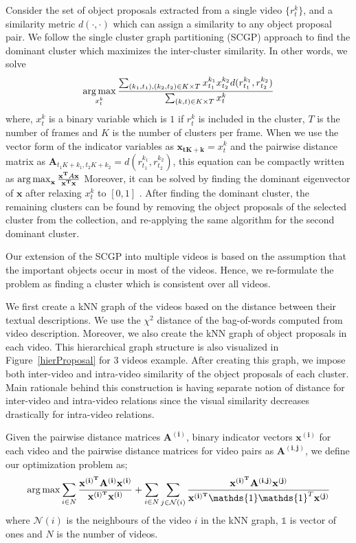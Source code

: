 Consider the set of object proposals extracted from a single video $\{r^k_t\}$, and a similarity metric $d(\cdot,\cdot)$ which can assign a similarity to any object proposal pair. We follow the single cluster graph partitioning (SCGP)\cite{scgp} approach to find the dominant cluster which maximizes the inter-cluster similarity. In other words, we solve
\begin{equation}
  \operatorname*{arg\,max}_{x^k_t} \frac{\sum_{(k_1,t_1),(k_2,t_2) \in K \times T} x^{k_1}_{t_1} x^{k_2}_{t_2} d(r^{k_1}_{t_1},r^{k_2}_{t_2})}{\sum_{(k,t) \in K \times T} x^{k}_t}
\end{equation}
where, $x^{k}_t$ is a binary variable which is $1$ if $r^{k}_t$ is included in the cluster, $T$ is the number of frames and $K$ is the number of clusters per frame. When we use the vector form of the indicator variables as $\mathbf{x_{tK+k}}=x^{k}_{t}$ and the pairwise distance matrix as $\mathbf{A}_{t_1K+k_1,t_2K+k_2}=d(r^{k_1}_{t_1},r^{k_2}_{t_2})$, this equation can be compactly written as
$\operatorname*{arg\,max}_{\mathbf{x}} \frac{\mathbf{x^T}A\mathbf{x}}{\mathbf{x^T}\mathbf{x}}$
Moreover, it can be solved by finding the dominant eigenvector of $\mathbf{x}$ after relaxing $x^{k}_t$ to $[0,1]$ \cite{scgp,scgp_eigen}. After finding the dominant cluster, the remaining clusters can be found by removing the object proposals of the selected cluster from the collection, and re-applying the same algorithm for the second dominant cluster.

Our extension of the SCGP into multiple videos is based on the assumption that the important objects occur in most of the videos. Hence, we re-formulate the problem as finding a cluster which is consistent over all videos. 

We first create a kNN graph of the videos based on the distance between their textual descriptions. We use the $\chi^2$ distance of the bag-of-words computed from video description. Moreover, we also create the kNN graph of object proposals in each video. This hierarchical graph structure is also visualized in Figure~\ref{hierProposal} for 3 videos example. After creating this graph, we impose both inter-video and intra-video similarity of the object proposals of each cluster. Main rationale behind this construction is having separate notion of distance for inter-video and intra-video relations since the visual similarity decreases drastically for intra-video relations.

Given the pairwise distance matrices $\mathbf{A^{(i)}}$, binary indicator vectors $\mathbf{x^{(i)}}$ for each video and the pairwise distance matrices for video pairs as $\mathbf{A^{(i,j)}}$, we define our optimization problem as;
\begin{equation}
\argmax \sum_{i \in N} \frac{\mathbf{x^{(i)^T}}\mathbf{A^{(i)}}\mathbf{x^{(i)}}}{\mathbf{x^{(i)^T}}\mathbf{x^{(i)}}} +
\sum_{i \in N} \sum_{j \in \mathcal{N}(i)} \frac{\mathbf{x^{(i)^T}}\mathbf{A^{(i,j)}}\mathbf{x^{(j)}}} {\mathbf{x^{(i)^T}}\mathds{1}\mathds{1}^T\mathbf{x^{(j)}}}
\end{equation}
where $\mathcal{N}(i)$ is the neighbours of the video $i$ in the kNN graph, $\mathds{1}$ is vector of ones and $N$ is the number of videos. 

